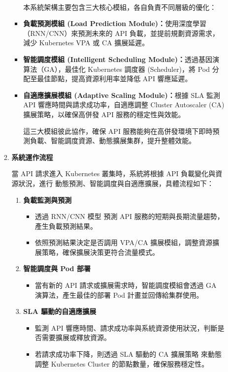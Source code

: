 \documentclass[12pt,a4paper]{article}
\begin{document}
\begin{enumerate}[label={(\zhdig*)}, leftmargin=2\parindent, listparindent=\parindent]
\begin{enumerate}[label={(\arabic*)}, leftmargin=\parindent, listparindent=\parindent]
\begin{enumerate}[label={(\zhdig*)}, leftmargin=\parindent, listparindent=\parindent]
\begin{itemize}[leftmargin=\parindent, listparindent=\parindent]
\\本系統架構主要包含三大核心模組，各自負責不同層級的優化：

\item \textbf{負載預測模組 (Load Prediction Module)：}使用深度學習（RNN/CNN）來預測未來的 API 負載，並提前規劃資源需求，減少 Kubernetes VPA 或 CA 擴展延遲。
\item \textbf{智能調度模組 (Intelligent Scheduling Module)：}透過基因演算法（GA），最佳化 Kubernetes 調度器 (Scheduler)，將 Pod 分配至最佳節點，提高資源利用率並降低 API 響應延遲。
\item \textbf{自適應擴展模組 (Adaptive Scaling Module)：}根據 SLA 監測 API 響應時間與請求成功率，自適應調整 Cluster Autoscaler (CA) 擴展策略，以確保高併發 API 服務的穩定性與效能。

這三大模組彼此協作，確保 API 服務能夠在高併發環境下即時預測負載、智能調度資源、動態擴展集群，提升整體效能。

\end{itemize}
    \item \textbf{
系統運作流程}

當 API 請求進入 Kubernetes 叢集時，系統將根據 API 負載變化與資源狀況，進行 動態預測、智能調度與自適應擴展，具體流程如下：
\begin{enumerate}[label={(\arabic*)}, leftmargin=\parindent, listparindent=\parindent]

    \item\textbf{
負載監測與預測}
\begin{itemize}[leftmargin=\parindent, listparindent=\parindent]

    \item 透過 RNN/CNN 模型 預測 API 服務的短期與長期流量趨勢，產生負載預測結果。
    \item 依照預測結果決定是否調用 VPA/CA 擴展模組，調整資源擴展策略，確保擴展決策更符合流量模式。
\end{itemize}
    \item\textbf{
智能調度與 Pod 部署}
\begin{itemize}[leftmargin=\parindent, listparindent=\parindent]
    \item 當有新的 API 請求或擴展需求時，智能調度模組會透過 GA 演算法，產生最佳的部署 Pod 計畫並回傳給集群使用。
\end{itemize}
\item\textbf{SLA 驅動的自適應擴展}
\begin{itemize}[leftmargin=\parindent, listparindent=\parindent]
    \item 監測 API 響應時間、請求成功率與系統資源使用狀況，判斷是否需要擴展或釋放資源。
    \item 若請求成功率下降，則透過 SLA 驅動的 CA 擴展策略 來動態調整 Kubernetes Cluster 的節點數量，確保服務穩定性。
\end{itemize}



\end{enumerate}
\end{enumerate}
\end{enumerate}
\end{enumerate}
\end{document}
